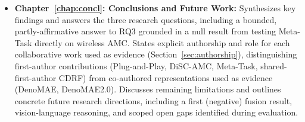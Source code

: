 \begin{itemize}
    \item 	\textbf{Chapter~\ref{chap:concl}: Conclusions and Future Work:} Synthesizes key findings and answers the three research questions, including a bounded, partly-affirmative answer to RQ3 grounded in a null result from testing Meta-Task directly on wireless AMC. States explicit authorship and role for each collaborative work used as evidence (Section~\ref{sec:authorship}), distinguishing first-author contributions (Plug-and-Play, DiSC-AMC, Meta-Task, shared-first-author CDRF) from co-authored representations used as evidence (DenoMAE, DenoMAE2.0). Discusses remaining limitations and outlines concrete future research directions, including a first (negative) fusion result, vision-language reasoning, and scoped open gaps identified during evaluation.
    
\end{itemize}